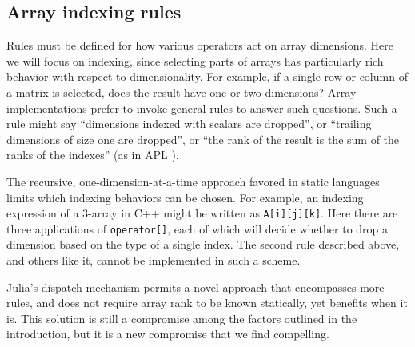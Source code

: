 \documentclass[preprint]{sigplanconf}
\newcommand{\code}[1]{\texttt{#1}}
\begin{document}


\subsection{Array indexing rules}

Rules must be defined for how various operators act
on array dimensions. Here we will focus on indexing, since selecting parts of
arrays has particularly rich behavior with respect to dimensionality. For
example, if a single row or column of a matrix is selected, does the result
have one or two dimensions? Array implementations prefer to invoke general
rules to answer such questions. Such a rule might say ``dimensions indexed
with scalars are dropped'', or ``trailing dimensions of size one are
dropped'', or ``the rank of the result is the sum of the ranks of the
indexes'' (as in APL \cite{APL}).

The recursive, one-dimension-at-a-time approach favored in static languages limits
which indexing behaviors can be chosen. For example, an indexing expression
of a 3-array in C++ might be written as \code{A[i][j][k]}. Here there are 
three applications of \code{operator[]}, each of which will decide whether to
drop a dimension based on the type of a single index. The second rule
described above, and others like it, cannot be implemented in such a
scheme.

Julia's dispatch mechanism permits a novel approach that encompasses more
rules, and does not require array rank to be known statically, yet
benefits when it is.
This solution is still a compromise among the factors outlined in
the introduction, but it is a new compromise that we find compelling.

\end{document}
